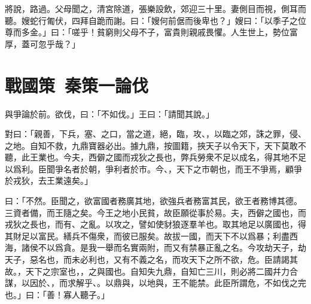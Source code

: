 將說，路過。父母聞之，清宮除道，張樂設飲，郊迎三十里。妻側目而視，側耳而聽。嫂蛇行匍伏，四拜自跪而謝。曰：「嫂何前倨而後卑也？」嫂曰：「以季子之位尊而多金。」曰：「嗟乎！貧窮則父母不子，富貴則親戚畏懼。人生世上，勢位富厚，蓋可忽乎哉？」

\section[司馬錯論伐蜀\quad{\small 戰國策 秦策一}]{{\normalsize 戰國策\ 秦策一}\quad {}論伐}
與爭論於前。欲伐，曰：「不如伐。」王曰：「請聞其說。」

對曰：「親善，下兵，塞、之口，當之道，絕，臨，攻、，以臨之郊，誅之罪，侵、之地。自知不救，九鼎寶器必出。據九鼎，按圖籍，挾天子以令天下，天下莫敢不聽，此王業也。今夫，西僻之國而戎狄之長也，弊兵勞衆不足以成名，得其地不足以爲利。臣聞爭名者於朝，爭利者於市。今、，天下之市朝也，而王不爭焉，顧爭於戎狄，去王業遠矣。」

曰：「不然。臣聞之，欲富國者務廣其地，欲強兵者務富其民，欲王者務博其德。三資者備，而王隨之矣。今王之地小民貧，故臣願從事於易。夫，西僻之國也，而戎狄之長也，而有、之亂。以攻之，譬如使豺狼逐羣羊也。取其地足以廣國也，得其財足以富民。繕兵不傷衆，而彼已服矣。故拔一國，而天下不以爲暴；利盡西海，諸侯不以爲貪。是我一舉而名實兩附，而又有禁暴正亂之名。今攻劫天子，劫天子，惡名也，而未必利也，又有不義之名，而攻天下之所不欲，危。臣請謁其故。，天下之宗室也，，之與國也。自知失九鼎，自知亡三川，則必將二國幷力合謀，以因於、，而求解乎、。以鼎與，以地與，王不能禁。此臣所謂危，不如伐之完也。」曰：「善！寡人聽子。」


